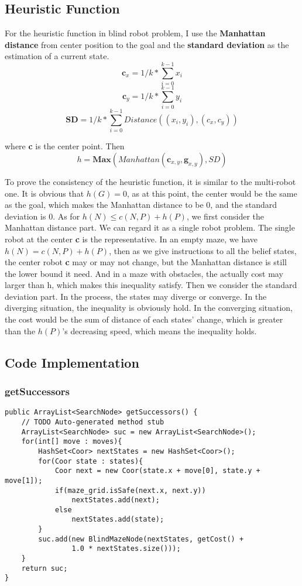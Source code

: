 \documentclass{article}
\begin{document}
\subsection{Heuristic Function}
For the heuristic function in blind robot problem, I use the \textbf{Manhattan distance} from center position to the goal and the \textbf{standard deviation} as the estimation of a current state. 
$$\textbf{c}_{x} = 1/k*\sum^{k-1}_{i=0}x_i$$
$$\textbf{c}_{y} = 1/k*\sum^{k-1}_{i=0}y_i$$
$$\textbf{SD} = 1/k*\sum^{k-1}_{i=0}Distance((x_i, y_i), (c_x, c_y)) $$

where \textbf{c} is the center point. Then
$$h = \textbf{Max}(Manhattan(\textbf{c}_{x,y}, \textbf{g}_{x,y}), SD)$$
\begin{flushleft}
To prove the consistency of the heuristic function, it is similar to the multi-robot one. It is obvious that $h(G)=0$, as at this point, the center would be the same as the goal, which makes the Manhattan distance to be 0, and the standard deviation is 0. As for $h(N) \leq c(N,P)+h(P)$, we first consider the Manhattan distance part. We can regard it as a single robot problem. The single robot at the center \textbf{c} is the representative. In an empty maze, we have $h(N)=c(N,P)+h(P)$, then as we give instructions to all the belief states, the center robot \textbf{c} may or may not change, but the Manhattan distance is still the lower bound it need. And in a maze with obstacles, the actually cost may larger than h, which makes this  inequality satisfy. Then we consider the standard deviation part. In the process, the states may diverge or converge. In the diverging situation, the inequality is obviously hold. In the converging situation, the cost would be the sum of distance of each states' change, which is greater than the $h(P)$'s decreasing speed, which means the inequality holds.
\end{flushleft}

\clearpage
\subsection{Code Implementation}
\subsubsection{getSuccessors}
\begin{lstlisting}
public ArrayList<SearchNode> getSuccessors() {
	// TODO Auto-generated method stub
	ArrayList<SearchNode> suc = new ArrayList<SearchNode>();
	for(int[] move : moves){
		HashSet<Coor> nextStates = new HashSet<Coor>();
		for(Coor state : states){
			Coor next = new Coor(state.x + move[0], state.y + move[1]);
			if(maze_grid.isSafe(next.x, next.y))
				nextStates.add(next);
			else
				nextStates.add(state);
		}
		suc.add(new BlindMazeNode(nextStates, getCost() + 
				1.0 * nextStates.size()));
	}
	return suc;
}
\end{lstlisting}
\end{document}
